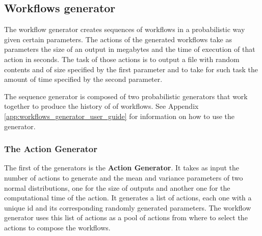 \subsection{Workflows generator}
The workflow generator creates sequences of workflows in a probabilistic way given certain parameters. The actions of the generated workflows take as parameters the size of an output in megabytes and the time of execution of that action in seconds.  The task of those actions is to output a file with random contents and of size specified by the first parameter and to take for such task the amount of time specified by the second parameter.

The sequence generator is composed of two probabilistic generators that work together to produce the history of of workflows.  See Appendix \ref{app:workflows_generator_user_guide} for information on how to use the generator.  

\subsubsection{The Action Generator}
The first of the generators is the \textbf{Action Generator}.  It takes as input the number of actions to generate and the mean and variance parameters of two normal distributions, one for the size of outputs and another one for the computational time of the action.  It generates a list of actions, each one with a unique id and its corresponding randomly generated parameters. The workflow generator uses this list of actions as a pool of actions from where to select the actions to compose the workflows.


